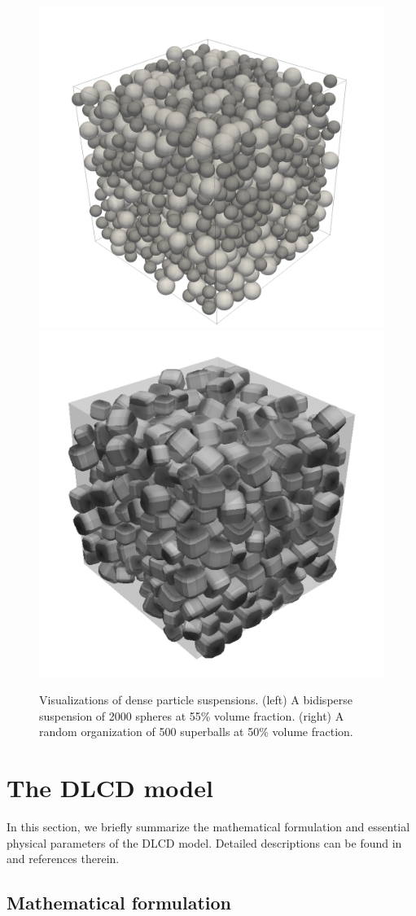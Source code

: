 \begin{figure}%
  \centering
  \includegraphics[width=0.44\columnwidth]{figs/np2000_vol0.55.png}
  \includegraphics[width=0.4\columnwidth]{figs/spb_np500_vol0.5.pdf}
  \caption{Visualizations of dense particle suspensions. (left) A bidisperse suspension of 2000 spheres at 55\% volume fraction. (right) A random organization of 500 superballs at 50\% volume fraction.}
  \label{fig:snap}
\end{figure}


\section{The DLCD model}
\label{sec:dlcd}

In this section, we briefly summarize the mathematical formulation and essential physical parameters of the DLCD model. Detailed descriptions can be found in \cite{Seto_PRL2013, Mari_Seto_2014JoR, Cheal_Ness_2018} and references therein.

\subsection{Mathematical formulation}
\label{sec:eqs}

